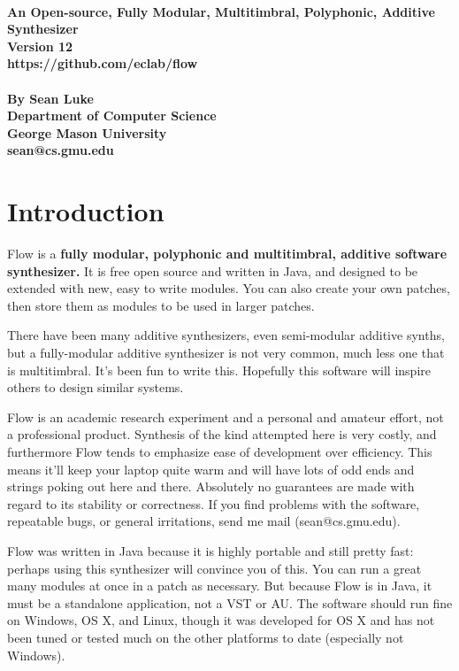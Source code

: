 \documentclass{article}
\newcommand\name{Flow}
\begin{document}
\noindent {\Huge\bf {\name}}\\[0.5em]
{\large \bf An Open-source, Fully Modular, Multitimbral, Polyphonic, Additive Synthesizer\\[0.2em]
Version 12\\[0.2em]
https://github.com/eclab/flow\\\\[0.2em]
By Sean Luke\\[0.2em]
Department of Computer Science\\[0.25em]
George Mason University\\[0.2em]
sean@cs.gmu.edu}

\tableofcontents

\clearpage

\section{Introduction}

{\name} is a {\bf fully modular, polyphonic and multitimbral, additive software synthesizer.}  It is free open source and written in Java, and designed to be extended with new, easy to write modules.  You can also create your own patches, then store them as modules to be used in larger patches. 

There have been many additive synthesizers, even semi-modular additive synths, but a fully-modular additive synthesizer is not very common, much less one that is multitimbral.   It's been fun to write this.  Hopefully this software will inspire others to design similar systems.

{\name} is an academic research experiment and a personal and amateur effort, not a professional product.  Synthesis of the kind attempted here is very costly, and furthermore {\name} tends to emphasize ease of development over efficiency.  This means it'll keep your laptop quite warm and will have lots of odd ends and strings poking out here and there.  Absolutely no guarantees are made with regard to its stability or correctness.  If you find problems with the software, repeatable bugs, or general irritations, send me mail (sean@cs.gmu.edu).

{\name} was written in Java because it is highly portable and still pretty fast: perhaps using this synthesizer will convince you of this.  You can run a great many modules at once in a patch as necessary.  But because {\name} is in Java, it must be a standalone application, not a VST or AU.  The software should run fine on Windows, OS X, and Linux, though it was developed for OS X and has not been tuned or tested much on the other platforms to date (especially not Windows).
\end{document}
